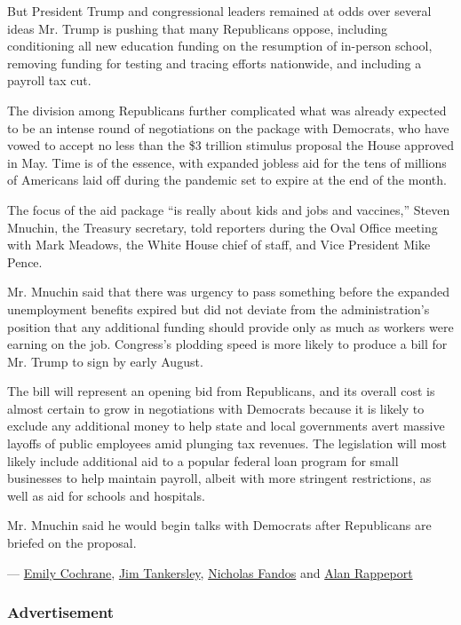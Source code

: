 But President Trump and congressional leaders remained at odds over
several ideas Mr. Trump is pushing that many Republicans oppose,
including conditioning all new education funding on the resumption of
in-person school, removing funding for testing and tracing efforts
nationwide, and including a payroll tax cut.

The division among Republicans further complicated what was already
expected to be an intense round of negotiations on the package with
Democrats, who have vowed to accept no less than the \$3 trillion
stimulus proposal the House approved in May. Time is of the essence,
with expanded jobless aid for the tens of millions of Americans laid off
during the pandemic set to expire at the end of the month.

The focus of the aid package ``is really about kids and jobs and
vaccines,'' Steven Mnuchin, the Treasury secretary, told reporters
during the Oval Office meeting with Mark Meadows, the White House chief
of staff, and Vice President Mike Pence.

Mr. Mnuchin said that there was urgency to pass something before the
expanded unemployment benefits expired but did not deviate from the
administration's position that any additional funding should provide
only as much as workers were earning on the job. Congress's plodding
speed is more likely to produce a bill for Mr. Trump to sign by early
August.

The bill will represent an opening bid from Republicans, and its overall
cost is almost certain to grow in negotiations with Democrats because it
is likely to exclude any additional money to help state and local
governments avert massive layoffs of public employees amid plunging tax
revenues. The legislation will most likely include additional aid to a
popular federal loan program for small businesses to help maintain
payroll, albeit with more stringent restrictions, as well as aid for
schools and hospitals.

Mr. Mnuchin said he would begin talks with Democrats after Republicans
are briefed on the proposal.

--- \href{https://www.nytimes.com/by/emily-cochrane}{Emily Cochrane},
\href{https://www.nytimes.com/by/jim-tankersley}{Jim Tankersley},
\href{https://www.nytimes.com/by/nicholas-fandos}{Nicholas Fandos} and
\href{https://www.nytimes.com/by/alan-rappeport}{Alan Rappeport}

\hypertarget{advertisement}{%
\subsubsection{Advertisement}\label{advertisement}}

